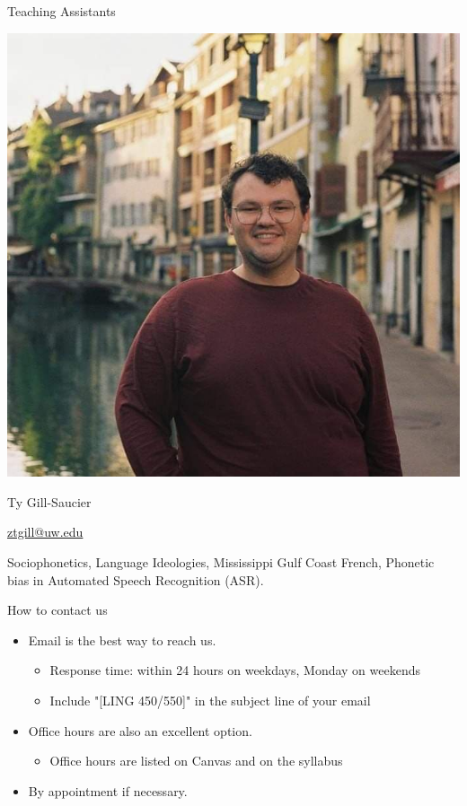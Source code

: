 \documentclass{beamer}
\begin{document}
\begin{frame}{Teaching Assistants}
    \begin{multicols}{2}
        \begin{center}
            \includegraphics[width=0.9\linewidth]{figs/Gill_2022.jpg} %
        \end{center}
        \columnbreak
        \begin{description}[font=\bfseries]
            \item[Name:] Ty Gill-Saucier
            \item[Contact:] \href{mailto:ztgill@uw.edu}{ztgill@uw.edu}
            \item[Research Interests:] Sociophonetics, Language
            Ideologies, Mississippi Gulf Coast French, Phonetic bias in
            Automated Speech Recognition (ASR).
        \end{description}
    \end{multicols}
\end{frame}

\begin{frame}{How to contact us}
    \begin{itemize}
        \item Email is the best way to reach us.
        \begin{itemize}
            \item Response time: within 24 hours on weekdays, Monday on weekends
            \item Include "[LING 450/550]" in the subject line of your email
        \end{itemize}
        \item Office hours are also an excellent option. 
        \begin{itemize}
            \item Office hours are listed on Canvas and on the syllabus
        \end{itemize}
        \item By appointment if necessary.
    \end{itemize}
\end{frame}
\end{document}
